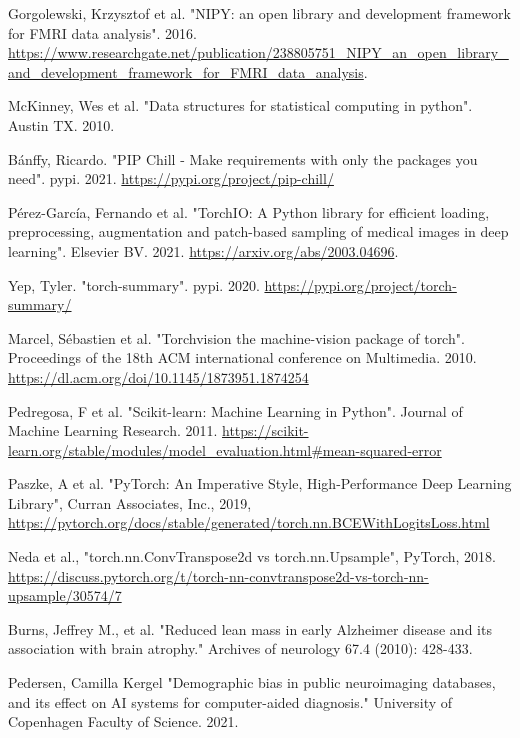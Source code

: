 \documentclass[12pt, fleqn, titlepage]{article}
\begin{document}
\begin{thebibliography}{9}
		 Gorgolewski, Krzysztof et al. "NIPY: an open library and development framework for FMRI data analysis". 2016. \url{https://www.researchgate.net/publication/238805751\_NIPY\_an\_open\_library\_and\_development\_framework\_for\_FMRI\_data\_analysis}.
		
		 McKinney, Wes et al. "Data structures for statistical computing in python". Austin TX. 2010.
		
		 Bánffy, Ricardo. "PIP Chill - Make requirements with only the packages you need". pypi. 2021. \url{https://pypi.org/project/pip-chill/}
		
		 Pérez-García, Fernando et al. "TorchIO: A Python library for efficient loading, preprocessing, augmentation and patch-based sampling of medical images in deep learning". Elsevier BV. 2021. \url{https://arxiv.org/abs/2003.04696}.	
		
		  Yep, Tyler. "torch-summary". pypi. 2020. \url{https://pypi.org/project/torch-summary/}
		
		 Marcel, Sébastien et al. "Torchvision the machine-vision package of torch". Proceedings of the 18th ACM international conference on Multimedia. 2010. \url{https://dl.acm.org/doi/10.1145/1873951.1874254}
		
		 Pedregosa, F et al. "Scikit-learn: Machine Learning in Python". Journal of Machine Learning Research. 2011. \url{https://scikit-learn.org/stable/modules/model_evaluation.html#mean-squared-error}
		
		 Paszke, A et al. "PyTorch: An Imperative Style, High-Performance Deep Learning Library", Curran Associates, Inc., 2019, \url{https://pytorch.org/docs/stable/generated/torch.nn.BCEWithLogitsLoss.html}
		
		 Neda et al., "torch.nn.ConvTranspose2d vs torch.nn.Upsample", PyTorch, 2018. \url{https://discuss.pytorch.org/t/torch-nn-convtranspose2d-vs-torch-nn-upsample/30574/7}
		
		 Burns, Jeffrey M., et al. "Reduced lean mass in early Alzheimer disease and its association with brain atrophy." Archives of neurology 67.4 (2010): 428-433.
		
		 Pedersen, Camilla Kergel "Demographic bias in public neuroimaging databases, and its effect on AI systems for computer-aided diagnosis." University of Copenhagen Faculty of Science. 2021.
		

\end{thebibliography}
\end{document}
